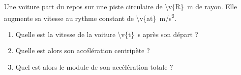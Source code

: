 Une voiture part du repos sur une piste circulaire de \qty{\v{R}}{m} de rayon. Elle augmente sa vitesse au rythme constant de \qty{\v{at}}{m/s^2}.

\begin{enumerate}[label=\alph*)]
    \item Quelle est la vitesse de la voiture \qty{\v{t}}{s} après son départ ?
    \item Quelle est alors son accélération centripète ?
    \item Quel est alors le module de son accélération totale ?
\end{enumerate}
